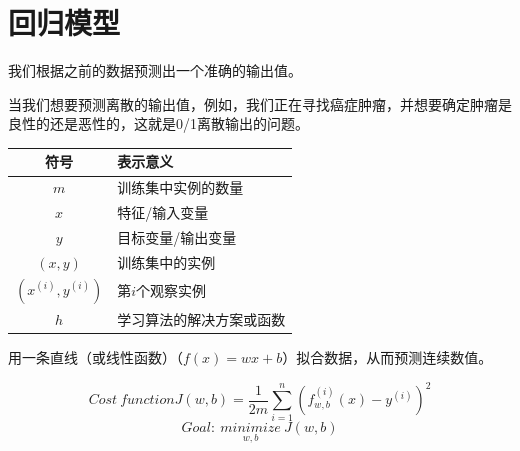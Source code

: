 \documentclass[12pt,a4paper]{ctexart}
\begin{document}
\section{回归模型}

\begin{definitionbox}[回归问题]
我们根据之前的数据预测出一个准确的输出值。
\end{definitionbox}
\begin{definitionbox}[分类问题]
当我们想要预测离散的输出值，例如，我们正在寻找癌症肿瘤，并想要确定肿瘤是良性的还是恶性的，这就是0/1离散输出的问题。
\end{definitionbox}
\begin{examplebox}[机器学习的一些符号表示]
\begin{center}
  \begin{tabularx}{\linewidth}{|c|X|}
      \hline
      符号 & 表示意义 \\
      \hline
      $m$ & 训练集中实例的数量\\
      \hline
      $x$ & 特征/输入变量\\
      \hline
      $y$ & 目标变量/输出变量 \\
      \hline
      $(x,y)$ & 训练集中的实例 \\
      \hline
      $(x^{(i)},y^{(i)})$ & 第$i$个观察实例 \\
      \hline
      $h$ & 学习算法的解决方案或函数 \\
      \hline
  \end{tabularx}
\end{center}
\end{examplebox}
\begin{definitionbox}[线性回归]
  用一条直线（或线性函数）（$f(x) = wx + b$）拟合数据，从而预测连续数值。
\end{definitionbox}
\begin{examplebox}[线性回归的代价函数]
  $$Cost \ function J(w,b) = \frac{1}{2m} \sum_{i = 1}^{n} (f_{w,b}^{(i)}(x) - y^{(i)})^2$$
  \[
  Goal : \ \underset{w,b}{minimize} \ J(w,b)
  \]
\end{examplebox}
\end{document}
